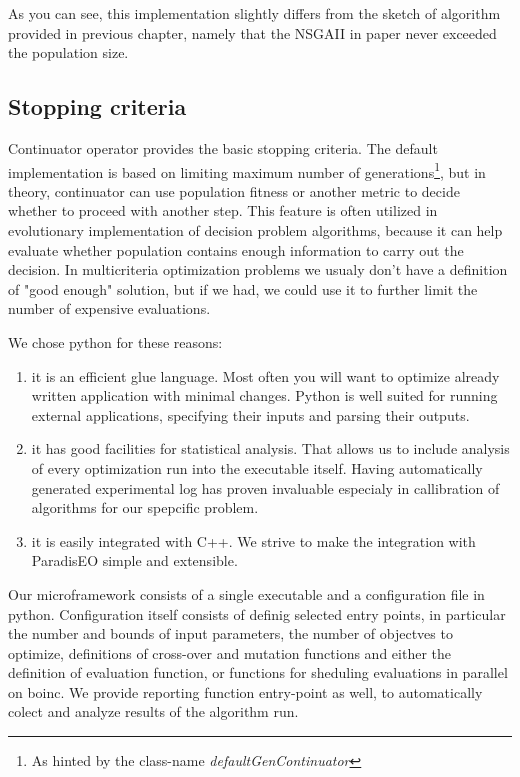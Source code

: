 \documentclass[12pt,oneside]{fithesis2}
\begin{document}
As you can see, this implementation slightly differs from the sketch of algorithm provided in previous chapter, namely that the NSGAII in paper never exceeded the population size.

\subsection{Stopping criteria}
Continuator operator provides the basic stopping criteria. The default implementation is based on limiting maximum number of generations\footnote{As hinted by the class-name \emph{defaultGenContinuator}}, but in theory, continuator can use population fitness or another metric to decide whether to proceed with another step. This feature is often utilized in evolutionary implementation of decision problem algorithms, because it can help evaluate whether population contains enough information to carry out the decision. In multicriteria optimization problems we usualy don't have a definition of "good enough" solution, but if we had, we could use it to further limit the number of expensive evaluations.

We chose python for these reasons:
\begin{enumerate}
\item it is an efficient glue language. 
Most often you will want to optimize already written application with minimal changes. Python is well suited for running external applications, specifying their inputs and parsing their outputs.
 
\item it has good facilities for statistical analysis.
That allows us to include analysis of every optimization run into the executable itself. Having automatically generated experimental log has proven invaluable especialy in callibration of algorithms for our spepcific problem.

\item it is easily integrated with C++.
We strive to make the integration with ParadisEO simple and extensible. 
\end{enumerate}

Our microframework consists of a single executable and a configuration file in python. Configuration itself consists of definig selected entry points, in particular the number and bounds of input parameters, the number of objectves to optimize, definitions of cross-over and mutation functions and either the definition of evaluation function, or functions for sheduling evaluations in parallel on boinc. We provide reporting function entry-point as well, to automatically colect and analyze results of the algorithm run.
\end{document}
